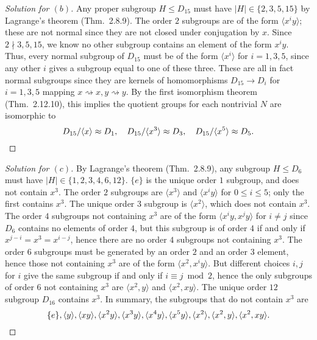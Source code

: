 \documentclass[12pt]{article}
\theoremstyle{remark}
\begin{document}
\begin{proof}[Solution for $(b)$]
  Any proper subgroup $H \leqslant D_{15}$ must have $\lvert H \rvert \in \{2,3,5,15\}$ by Lagrange's theorem (Thm.~2.8.9). The order $2$ subgroups are of the form $\langle x^iy \rangle$; these are not normal since they are not closed under conjugation by $x$. Since $2 \nmid 3,5,15$, we know no other subgroup contains an element of the form $x^iy$. Thus, every normal subgroup of $D_{15}$ must be of the form $\langle x^i \rangle$ for $i = 1,3,5$, since any other $i$ gives a subgroup equal to one of these three. These are all in fact normal subgroups since they are kernels of homomorphisms $D_{15} \to D_i$ for $i = 1,3,5$ mapping $x \rightsquigarrow x, y \rightsquigarrow y$. By the first isomorphism theorem (Thm.~2.12.10), this implies the quotient groups for each nontrivial $N$ are isomorphic to
  \begin{equation*}
    D_{15}/\langle x \rangle \approx D_1, \quad D_{15}/\langle x^3 \rangle \approx D_3, \quad D_{15}/\langle x^5 \rangle \approx D_5.\qedhere
  \end{equation*}
\end{proof}
\begin{proof}[Solution for $(c)$]
  By Lagrange's theorem (Thm.~2.8.9), any subgroup $H \leqslant D_6$ must have $\lvert H \rvert \in \{1,2,3,4,6,12\}$. $\{e\}$ is the unique order $1$ subgroup, and does not contain $x^3$. The order $2$ subgroups are $\langle x^3 \rangle$ and $\langle x^iy\rangle$ for $0 \le i \le 5$; only the first contains $x^3$. The unique order $3$ subgroup is $\langle x^2 \rangle$, which does not contain $x^3$. The order $4$ subgroups not containing $x^3$ are of the form $\langle x^iy,x^jy\rangle$ for $i \ne j$ since $D_6$ contains no elements of order $4$, but this subgroup is of order $4$ if and only if $x^{j-i} = x^3 = x^{i-j}$, hence there are no order $4$ subgroups not containing $x^3$. The order $6$ subgroups must be generated by an order $2$ and an order $3$ element, hence those not containing $x^3$ are of the form $\langle x^2,x^iy \rangle$. But different choices $i,j$ for $i$ give the same subgroup if and only if $i \equiv j \bmod 2$, hence the only subgroups of order $6$ not containing $x^3$ are $\langle x^2,y\rangle$ and $\langle x^2,xy \rangle$. The unique order $12$ subgroup $D_{16}$ contains $x^3$. In summary, the subgroups that do not contain $x^3$ are
  \begin{equation*}
    \{e\}, \langle y \rangle, \langle xy \rangle, \langle x^2y \rangle, \langle x^3y \rangle, \langle x^4y \rangle, \langle x^5y \rangle, \langle x^2 \rangle, \langle x^2, y \rangle, \langle x^2, xy \rangle.\qedhere
  \end{equation*}
\end{proof}
\end{document}
